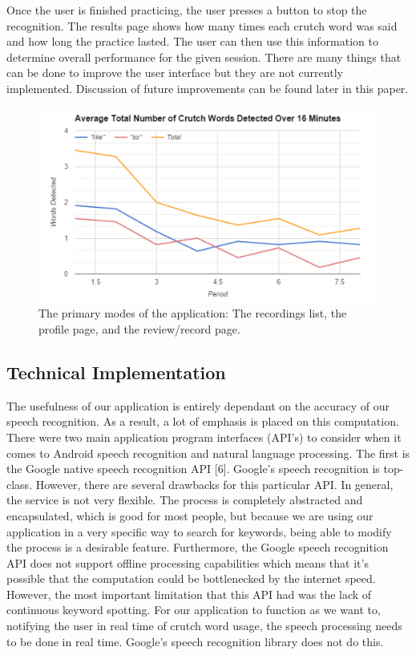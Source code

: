 \documentclass{sigchi}
\begin{document}
Once the user is finished practicing, the user presses a button to stop the recognition. The results page shows how many times each crutch word was said and how long the practice lasted. The user can then use this information to determine overall performance for the given session. There are many things that can be done to improve the user interface but they are not currently implemented. Discussion of future improvements can be found later in this paper.

\begin{figure}[!h]
\centering
\includegraphics[width=0.9\columnwidth]{graph}
\caption{The primary modes of the application: The recordings list, the profile page, and the review/record page.
}
\label{fig:figure1}
\end{figure}


\subsection{Technical Implementation}

The usefulness of our application is entirely dependant on the accuracy of our speech recognition. As a result, a lot of emphasis is placed on this computation. There were two main application program interfaces (API’s) to consider when it comes to Android speech recognition and natural language processing. The first is the Google native speech recognition API [6]. Google's speech recognition is top-class. However, there are several drawbacks for this particular API. In general, the service is not very flexible. The process is completely abstracted and encapsulated, which is good for most people, but because we are using our application in a very specific way to search for keywords, being able to modify the process is a desirable feature. Furthermore, the Google speech recognition API does not support offline processing capabilities which means that it’s possible that the computation could be bottlenecked by the internet speed. However, the most important limitation that this API had was the lack of continuous keyword spotting. For our application to function as we want to, notifying the user in real time of crutch word usage, the speech processing needs to be done in real time. Google’s speech recognition library does not do this. 
\end{document}
